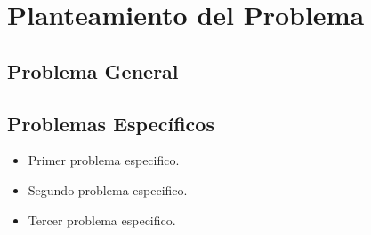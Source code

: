 \chapter{Planteamiento del Problema}


\section{Problema General}



\section{Problemas Específicos}

\begin{itemize}
	\item Primer problema especifico.
	\item Segundo problema especifico.
	\item Tercer problema especifico.	
\end{itemize}
